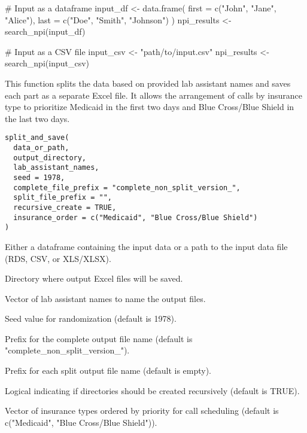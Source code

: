 \documentclass[a4paper]{book}
\begin{document}
%
\begin{Examples}
\begin{ExampleCode}
# Input as a dataframe
input_df <- data.frame(
  first = c("John", "Jane", "Alice"),
  last = c("Doe", "Smith", "Johnson")
)
npi_results <- search_npi(input_df)

# Input as a CSV file
input_csv <- "path/to/input.csv"
npi_results <- search_npi(input_csv)

\end{ExampleCode}
\end{Examples}
%
\begin{Description}
This function splits the data based on provided lab assistant names and saves each part as a separate Excel file.
It allows the arrangement of calls by insurance type to prioritize Medicaid in the first two days and Blue Cross/Blue Shield in the last two days.
\end{Description}
%
\begin{Usage}
\begin{verbatim}
split_and_save(
  data_or_path,
  output_directory,
  lab_assistant_names,
  seed = 1978,
  complete_file_prefix = "complete_non_split_version_",
  split_file_prefix = "",
  recursive_create = TRUE,
  insurance_order = c("Medicaid", "Blue Cross/Blue Shield")
)
\end{verbatim}
\end{Usage}
%
\begin{Arguments}
\begin{ldescription}
\item[\code{data\_or\_path}] Either a dataframe containing the input data or a path to the input data file (RDS, CSV, or XLS/XLSX).

\item[\code{output\_directory}] Directory where output Excel files will be saved.

\item[\code{lab\_assistant\_names}] Vector of lab assistant names to name the output files.

\item[\code{seed}] Seed value for randomization (default is 1978).

\item[\code{complete\_file\_prefix}] Prefix for the complete output file name (default is "complete\_non\_split\_version\_").

\item[\code{split\_file\_prefix}] Prefix for each split output file name (default is empty).

\item[\code{recursive\_create}] Logical indicating if directories should be created recursively (default is TRUE).

\item[\code{insurance\_order}] Vector of insurance types ordered by priority for call scheduling (default is c("Medicaid", "Blue Cross/Blue Shield")).
\end{ldescription}
\end{Arguments}
\end{document}
